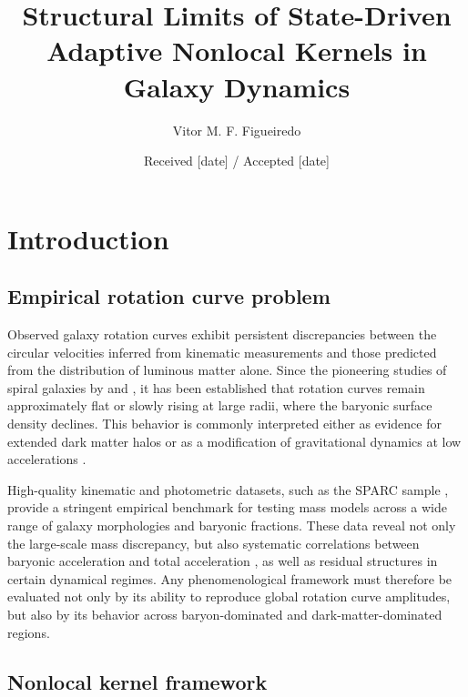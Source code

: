 \documentclass{aa}
\title{Structural Limits of State-Driven Adaptive Nonlocal Kernels in Galaxy Dynamics}
\institute{Independent Researcher, Nisa, Portugal\\
	\email{vitor.figueiredo.research@protonmail.com}}
\author{Vitor M. F. Figueiredo
	\orcidlink{0009-0004-7358-4622}}
\date{Received [date] / Accepted [date]}
\begin{document}
	\maketitle
\section{Introduction}

\subsection{Empirical rotation curve problem}

Observed galaxy rotation curves exhibit persistent discrepancies between the 
circular velocities inferred from kinematic measurements and those predicted 
from the distribution of luminous matter alone. Since the pioneering studies 
of spiral galaxies by \citet{rubin1980} and \citet{bosma1981}, it has been 
established that rotation curves remain approximately flat or slowly rising 
at large radii, where the baryonic surface density declines. This behavior 
is commonly interpreted either as evidence for extended dark matter halos 
\citep{nfw1997} or as a modification of gravitational dynamics at low 
accelerations \citep{milgrom1983}.

High-quality kinematic and photometric datasets, such as the SPARC sample 
\citep{lelli2016}, provide a stringent empirical benchmark for testing mass 
models across a wide range of galaxy morphologies and baryonic fractions. 
These data reveal not only the large-scale mass discrepancy, but also 
systematic correlations between baryonic acceleration and total acceleration 
\citep{mcgaugh2016, lelli2017}, as well as residual structures in certain 
dynamical regimes. Any phenomenological framework must therefore be evaluated 
not only by its ability to reproduce global rotation curve amplitudes, but 
also by its behavior across baryon-dominated and dark-matter-dominated regions.

\subsection{Nonlocal kernel framework}
\end{document}
